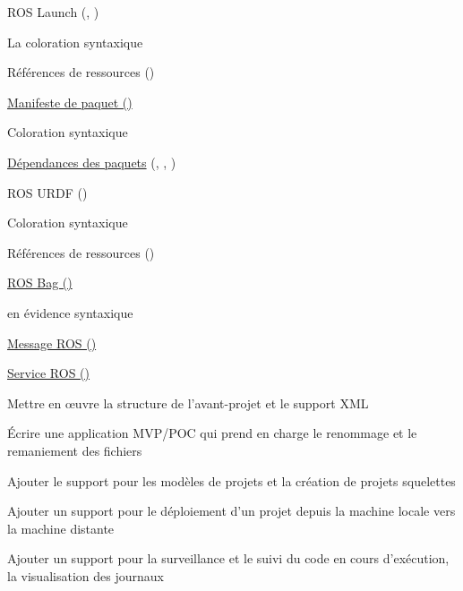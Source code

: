\begin{multicols}{2}
\begin{todolist}
\item[\done] ROS Launch (\href{https://wiki.ros.org/roslaunch/XML}{}, \href{https://wiki.ros.org/rostest/Writing}{})
\begin{todolist}
\item[\done] La coloration syntaxique
\item[\done] Références de ressources ()
\end{todolist}
\item[\done] \href{https://wiki.ros.org/Manifest}{Manifeste de paquet ()}
\begin{todolist}
\item[\done] Coloration syntaxique
\item[\done] \href{https://wiki.ros.org/catkin/package.xml#Dependencies}{Dépendances des paquets} (, , )
\end{todolist}
\item[\done] ROS URDF ()
\begin{todolist}
\item[\done] Coloration syntaxique
\item[\done] Références de ressources ()
\end{todolist}
\item[\done] \href{https://wiki.ros.org/Bags/Format}{ROS Bag ()}
\begin{todolist}
\Mise en évidence syntaxique
\end{todolist}
\item[\done] \href{https://wiki.ros.org/msg}{Message ROS ()}
\item[\done] \href{https://wiki.ros.org/srv}{Service ROS ()}
\item[\done] Mettre en œuvre la structure de l'avant-projet et le support XML
\item[\done] Écrire une application MVP/POC qui prend en charge le renommage et le remaniement des fichiers
\item[\done] Ajouter le support pour les modèles de projets et la création de projets squelettes
\item[\done] Ajouter un support pour le déploiement d'un projet depuis la machine locale vers la machine distante
\item[\done]Ajouter un support pour la surveillance et le suivi du code en cours d'exécution, la visualisation des journaux

\end{todolist}
\end{multicols}
